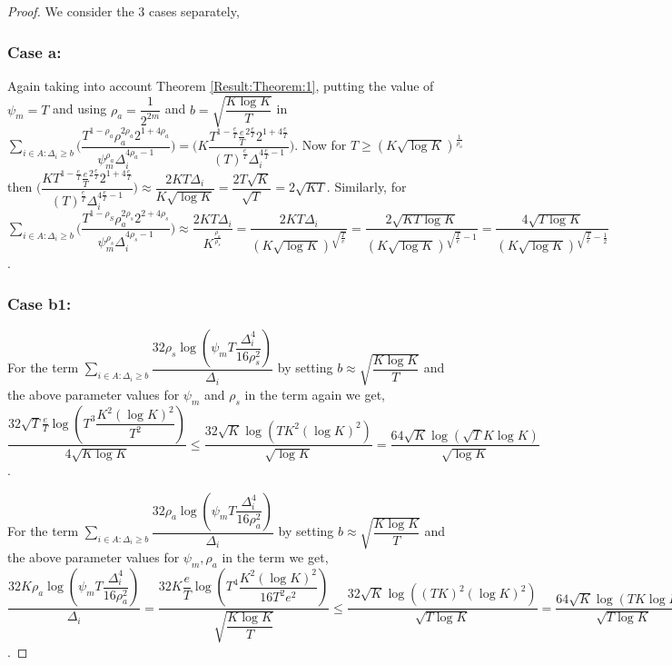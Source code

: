 \begin{proof}
We consider the $3$ cases separately,
\subsubsection{Case a:}
Again taking into account Theorem \ref{Result:Theorem:1}, putting the value of $\psi_{m}=T$ and using $\rho_{a}=\dfrac{1}{2^{2m}}$ and $b=\sqrt{\dfrac{K\log K}{T}}$ in $\sum_{i\in A:\Delta_{i}\geq b}\bigg(\dfrac{T^{1-\rho_{a}}\rho_{a}^{2\rho_{a}}2^{1+4\rho_{a}}}{\psi_{m}^{\rho_{a}}\Delta_{i}^{4\rho_{a}-1}} \bigg)= \bigg(K\dfrac{T^{1-\frac{e}{T}}\frac{e}{T}^{2\frac{e}{T}}2^{1+4\frac{e}{T}}}{(T)^{\frac{e}{T}}\Delta_{i}^{4\frac{e}{T}-1}} \bigg)$.  Now for $T\geq (K\sqrt{\log K})^{\frac{1}{\rho_{a}}}$ then $ \bigg(\dfrac{KT^{1-\frac{e}{T}}\frac{e}{T}^{2\frac{e}{T}}2^{1+4\frac{e}{T}}}{(T)^{\frac{e}{T}}\Delta_{i}^{4\frac{e}{T}-1}} \bigg)\approx\dfrac{2KT\Delta_{i}}{K\sqrt{\log K}}=\dfrac{2T\sqrt{K}}{\sqrt{T}}= 2\sqrt{KT}$. Similarly, for $\sum_{i\in A:\Delta_{i}\geq b}\bigg(\dfrac{T^{1-\rho_{S}}\rho_{a}^{2\rho_{s}}2^{2+4\rho_{s}}}{\psi_{m}^{\rho_{s}}\Delta_{i}^{4\rho_{s}-1}} \bigg) \approx\dfrac{2KT\Delta_{i}}{K^{\frac{\rho_{a}}{\rho_{s}}}}= \dfrac{2KT\Delta_{i}}{(K\sqrt{\log K})^{\sqrt{\frac{T}{e}}}} = \dfrac{2\sqrt{KT\log K}}{(K\sqrt{\log K})^{\sqrt{\frac{T}{e}}-1}}= \dfrac{4\sqrt{T\log K}}{(K\sqrt{\log K})^{\sqrt{\frac{T}{e}}-\frac{1}{2}}}$.
\subsubsection{Case b1:}
\par For the term $\sum_{i\in A:\Delta_{i}\geq b}\dfrac{32\rho_{s}\log{(\psi_{m}T\dfrac{\Delta_{i}^{4}}{16\rho_{s}^{2}})}}{\Delta_{i}}$ by setting $b\approx \sqrt{\dfrac{K\log K}{T}}$ and the above parameter values for $\psi_{m}$ and $\rho_{s}$  in the term again we get,
$\dfrac{32\sqrt{T}\frac{e}{T}\log{(T^{3}\dfrac{K^{2}(\log K)^{2}}{T^{2}})}}{4\sqrt{K\log K}} \leq \dfrac{32\sqrt{K}\log{(TK^{2}(\log K)^{2})}}{\sqrt{\log K}}=\dfrac{64\sqrt{K}\log{(\sqrt{T}K\log K)}}{\sqrt{\log K}}$.
\par For the term $\sum_{i\in A:\Delta_{i}\geq b}\dfrac{32\rho_{a}\log{(\psi_{m}T\dfrac{\Delta_{i}^{4}}{16\rho_{a}^{2}})}}{\Delta_{i}}$ by setting $b\approx \sqrt{\dfrac{K\log K}{T}}$ and the above parameter values for $\psi_{m},\rho_{a}$ in the term we get, 
$\dfrac{32K\rho_{a}\log{(\psi_{m}T\dfrac{\Delta_{i}^{4}}{16\rho_{a}^{2}})}}{\Delta_{i}}= \dfrac{32K\dfrac{e}{T}\log{(T^{4}\dfrac{K^{2}(\log K)^{2}}{16T^{2}e^{2}})}}{\sqrt{\dfrac{K\log K}{T}}}\leq \dfrac{32\sqrt{K}\log{((TK)^{2}(\log K)^{2})}}{\sqrt{T\log K}}= \dfrac{64\sqrt{K}\log{(TK\log K)}}{\sqrt{T\log K}}$.

\end{proof}

